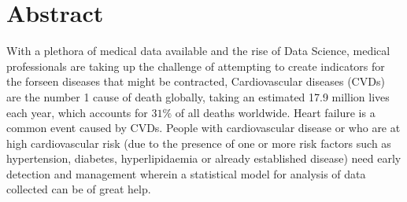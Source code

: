 \thispagestyle{plain} %



\chapter*{Abstract} %
With a plethora of medical data available and the rise of Data Science, medical professionals are taking up the challenge of attempting to create indicators for the forseen diseases that might be contracted, Cardiovascular diseases (CVDs) are the number 1 cause of death globally, taking an estimated 17.9 million lives each year, which accounts for $31\%$ of all deaths worldwide. Heart failure is a common event caused by CVDs. People with cardiovascular disease or who are at high cardiovascular risk (due to the presence of one or more risk factors such as hypertension, diabetes, hyperlipidaemia or already established disease) need early detection and management wherein a statistical model for analysis of data collected can be of great help.

\blankpage


